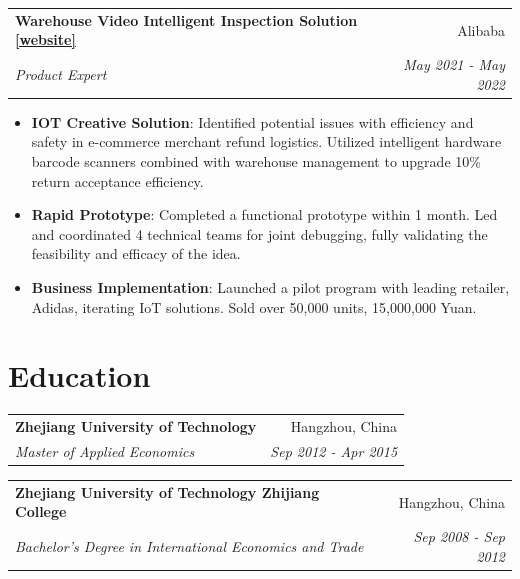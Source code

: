 \documentclass[letterpaper,11pt]{article}
\makeatletter
\newcommand{\resumeItem}[2]{
  \item\small{
    \textbf{#1}{: #2 \vspace{-2pt}}
  }
}
\newcommand{\resumeSubheading}[4]{
  \vspace{-3pt}\item
    \begin{tabular*}{0.97\textwidth}{l@{\extracolsep{\fill}}r}
      \textbf{#1} & #2 \\
      \textit{\small#3} & \textit{\small #4} \\
    \end{tabular*}\vspace{-8pt}
}
\newcommand{\resumeSubHeadingListStart}{}
\newcommand{\resumeSubHeadingListEnd}{}
\newcommand{\resumeItemListStart}{\begin{itemize}}
\newcommand{\resumeItemListEnd}{\end{itemize}\vspace{-8pt}}
\makeatother
\begin{document}
\vspace{5pt}


  
   \resumeSubheading{Warehouse Video Intelligent Inspection Solution \href{https://gtxwsy.yuque.com/gtxwsy/miv5ag/ih3dqq?}{[website]}
}{Alibaba}
    {Product Expert}{May 2021 - May 2022}
    \resumeItemListStart
        \resumeItem{IOT Creative Solution}
          {Identified potential issues with efficiency and safety in e-commerce merchant refund logistics. Utilized intelligent hardware barcode scanners combined with warehouse management to upgrade 10\% return acceptance efficiency.}
           \resumeItem{Rapid Prototype}
          {Completed a functional prototype within 1 month. Led and coordinated 4 technical teams for joint debugging, fully validating the feasibility and efficacy of the idea.}
          \resumeItem{Business Implementation}
          {Launched a pilot program with leading retailer, Adidas, iterating IoT solutions. Sold over 50,000 units, 15,000,000 Yuan.}
        
      \resumeItemListEnd
\resumeSubHeadingListEnd


\vspace{5pt}

\section{Education}
  \resumeSubHeadingListStart
    \resumeSubheading
      {Zhejiang University of Technology}{Hangzhou, China}
      {Master of Applied Economics}{Sep 2012 - Apr 2015}
        \vspace{10pt}   
    \resumeSubheading
      {Zhejiang University of Technology Zhijiang College}{Hangzhou, China}
      {Bachelor's Degree in International Economics and Trade}{Sep 2008 - Sep 2012}


  \resumeSubHeadingListEnd
\vspace{10pt}

\end{document}
